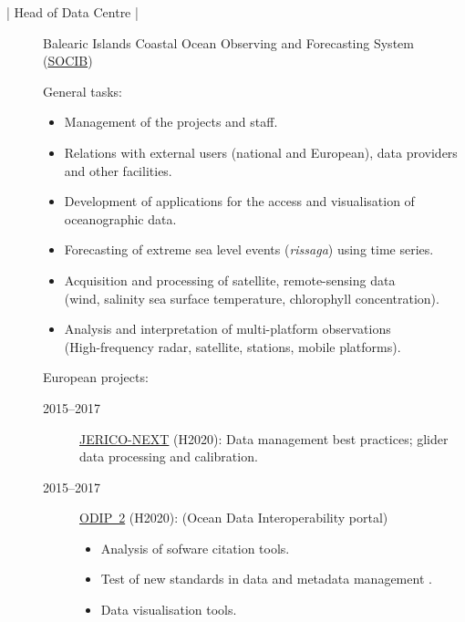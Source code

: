 \documentclass[10pt,a4paper,svgnames]{article}
\begin{document}
\begin{description}
\item[ | Head of Data Centre |] Balearic Islands Coastal Ocean Observing and Forecasting System (\href{http//www.socib.eu}{SOCIB})

General tasks:
\begin{itemize}%
\item Management of the projects and staff.
\item Relations with external users (national and European), data providers and other facilities.
\item Development of applications for the access and visualisation of oceanographic data.
\item Forecasting of extreme sea level events (\textit{rissaga}) using time series.
\item Acquisition and processing of satellite, remote-sensing data\\(wind, salinity sea surface temperature, chlorophyll concentration).
\item Analysis and interpretation of multi-platform observations\\(High-frequency radar, satellite, stations, mobile platforms).
\end{itemize}
European projects:
\begin{description}
\item[2015--2017] \href{http://www.jerico-ri.eu/}{JERICO-NEXT} (H2020): Data management best practices; glider data processing and calibration.
\item[2015--2017] \href{http://www.odip.eu/}{ODIP~2} (H2020):  (Ocean Data Interoperability portal)
\begin{itemize}
\item Analysis of sofware citation tools.
\item Test of new standards in data and metadata management .
\item Data visualisation tools.
\end{itemize}


\end{description}
\end{description}
\end{document}
